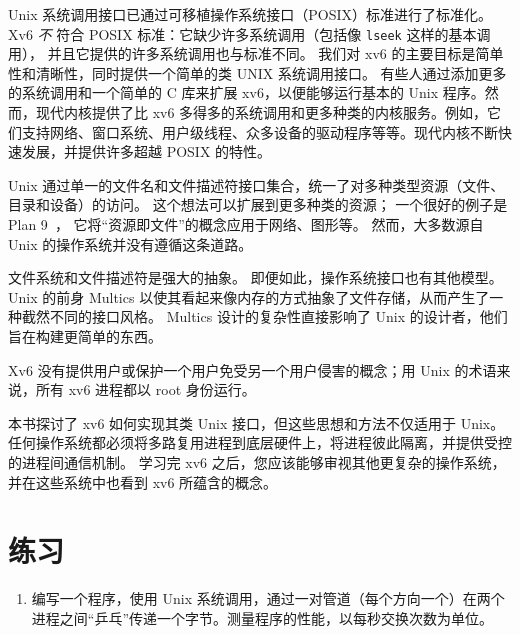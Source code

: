 Unix 系统调用接口已通过可移植操作系统接口（POSIX）标准进行了标准化。
Xv6
\textit{不}
符合 POSIX 标准：它缺少许多系统调用（包括像
\lstinline{lseek}
这样的基本调用），
并且它提供的许多系统调用也与标准不同。
我们对 xv6 的主要目标是简单性和清晰性，同时提供一个简单的类 UNIX 系统调用接口。
有些人通过添加更多的系统调用和一个简单的 C 库来扩展 xv6，以便能够运行基本的 Unix 程序。然而，现代内核提供了比 xv6 多得多的系统调用和更多种类的内核服务。例如，它们支持网络、窗口系统、用户级线程、众多设备的驱动程序等等。现代内核不断快速发展，并提供许多超越 POSIX 的特性。

Unix 通过单一的文件名和文件描述符接口集合，统一了对多种类型资源（文件、目录和设备）的访问。
这个想法可以扩展到更多种类的资源；
一个很好的例子是 Plan 9~\cite{Presotto91plan9}，
它将“资源即文件”的概念应用于网络、图形等。
然而，大多数源自 Unix 的操作系统并没有遵循这条道路。

文件系统和文件描述符是强大的抽象。
即便如此，操作系统接口也有其他模型。
Unix 的前身 Multics 以使其看起来像内存的方式抽象了文件存储，从而产生了一种截然不同的接口风格。
Multics 设计的复杂性直接影响了 Unix 的设计者，他们旨在构建更简单的东西。

Xv6 没有提供用户或保护一个用户免受另一个用户侵害的概念；用 Unix 的术语来说，所有 xv6 进程都以 root 身份运行。

本书探讨了 xv6 如何实现其类 Unix 接口，但这些思想和方法不仅适用于 Unix。
任何操作系统都必须将多路复用进程到底层硬件上，将进程彼此隔离，并提供受控的进程间通信机制。
学习完 xv6 之后，您应该能够审视其他更复杂的操作系统，并在这些系统中也看到 xv6 所蕴含的概念。

\section{练习}

\begin{enumerate}

\item 编写一个程序，使用 Unix 系统调用，通过一对管道（每个方向一个）在两个进程之间“乒乓”传递一个字节。测量程序的性能，以每秒交换次数为单位。

\end{enumerate}
